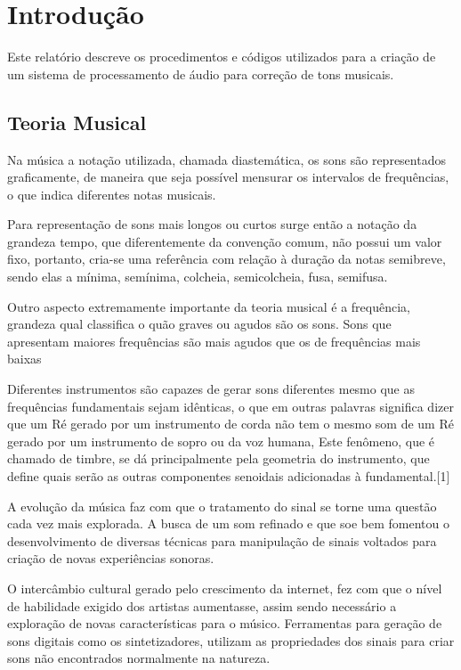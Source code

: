 
\chapter[Introdução]{Introdução}

Este relatório descreve os procedimentos e códigos utilizados para a criação de um sistema de processamento de áudio para correção de tons musicais.

\section*{Teoria Musical}
Na música a notação utilizada, chamada diastemática, os sons são representados graficamente, de maneira que seja possível mensurar os intervalos de frequências, o que indica diferentes notas musicais. 

Para representação de sons mais longos ou curtos surge então a notação da grandeza tempo, que diferentemente da convenção comum, não possui um valor fixo, portanto, cria-se uma referência com relação à duração da notas semibreve, sendo elas a mínima, semínima, colcheia, semicolcheia, fusa, semifusa.

Outro aspecto extremamente importante da teoria musical é a frequência, grandeza qual classifica o quão graves ou agudos são os sons. Sons que apresentam maiores frequências são mais agudos que os de frequências mais baixas 

Diferentes instrumentos são capazes de gerar sons diferentes mesmo que as frequências fundamentais sejam idênticas, o que em outras palavras significa dizer que um Ré gerado por um instrumento de corda não tem o mesmo som de um Ré gerado por um instrumento de sopro ou da voz humana, Este fenômeno, que é chamado de timbre, se dá principalmente pela geometria do instrumento, que define quais serão as outras componentes senoidais adicionadas à fundamental.[1]

A evolução da música faz com que o tratamento do sinal se torne uma questão cada vez mais explorada. A busca de um som refinado e que soe bem fomentou o desenvolvimento de  diversas técnicas para manipulação de sinais voltados para criação de novas experiências sonoras. 
    
O intercâmbio cultural gerado pelo crescimento da internet, fez com que o nível de habilidade exigido dos artistas aumentasse, assim sendo necessário a exploração de novas características para o músico. Ferramentas para geração de sons digitais como os sintetizadores, utilizam as propriedades dos sinais para criar sons não encontrados normalmente na natureza.
    
